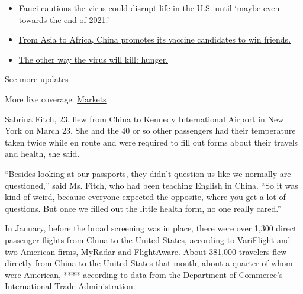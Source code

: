 \begin{itemize}
\tightlist
\item
  \href{https://www.nytimes3xbfgragh.onion/2020/09/11/world/covid-19-coronavirus.html?action=click\&pgtype=Article\&state=default\&region=MAIN_CONTENT_1\&context=storylines_live_updates\#link-dfb8a16}{Fauci
  cautions the virus could disrupt life in the U.S. until `maybe even
  towards the end of 2021.'}
\item
  \href{https://www.nytimes3xbfgragh.onion/2020/09/11/world/covid-19-coronavirus.html?action=click\&pgtype=Article\&state=default\&region=MAIN_CONTENT_1\&context=storylines_live_updates\#link-7104d154}{From
  Asia to Africa, China promotes its vaccine candidates to win friends.}
\item
  \href{https://www.nytimes3xbfgragh.onion/2020/09/11/world/covid-19-coronavirus.html?action=click\&pgtype=Article\&state=default\&region=MAIN_CONTENT_1\&context=storylines_live_updates\#link-393ad215}{The
  other way the virus will kill: hunger.}
\end{itemize}

\href{https://www.nytimes3xbfgragh.onion/2020/09/11/world/covid-19-coronavirus.html?action=click\&pgtype=Article\&state=default\&region=MAIN_CONTENT_1\&context=storylines_live_updates}{See
more updates}

More live coverage:
\href{https://www.nytimes3xbfgragh.onion/live/2020/09/11/business/stock-market-today-coronavirus?action=click\&pgtype=Article\&state=default\&region=MAIN_CONTENT_1\&context=storylines_live_updates}{Markets}

Sabrina Fitch, 23, flew from China to Kennedy International Airport in
New York on March 23. She and the 40 or so other passengers had their
temperature taken twice while en route and were required to fill out
forms about their travels and health, she said.

``Besides looking at our passports, they didn't question us like we
normally are questioned,'' said Ms. Fitch, who had been teaching English
in China. ``So it was kind of weird, because everyone expected the
opposite, where you get a lot of questions. But once we filled out the
little health form, no one really cared.''

In January, before the broad screening was in place, there were over
1,300 direct passenger flights from China to the United States,
according to VariFlight and two American firms, MyRadar and FlightAware.
About 381,000 travelers flew directly from China to the United States
that month, about a quarter of whom were American, **** according to
data from the Department of Commerce's International Trade
Administration.

